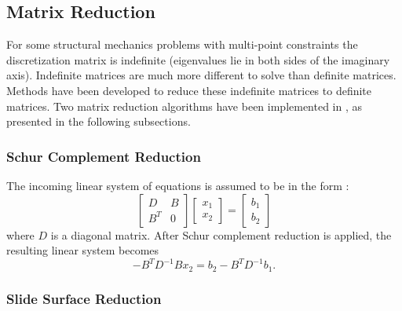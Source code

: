 \subsection{Matrix Reduction}
                                                                                
For some structural mechanics problems with multi-point constraints the
discretization matrix is indefinite (eigenvalues lie in both sides of
the imaginary axis). Indefinite matrices are much more different to solve
than definite matrices. Methods have been developed to reduce these
indefinite matrices to definite matrices.  Two matrix reduction algorithms
have been implemented in \hypre{}, as presented in the following subsections.
                                                                                
\subsubsection{Schur Complement Reduction}
                                                                                
The incoming linear system of equations is assumed to be in the form :
\[ \left[
\begin{array}{cc}
   D   & B \\
   B^T & 0
\end{array}
  \right]
  \left[
\begin{array}{c}
   x_1 \\
   x_2
\end{array}
  \right]
  =
  \left[
\begin{array}{c}
   b_1 \\
   b_2
\end{array}
  \right]
\]
where $D$ is a diagonal matrix.  After Schur complement reduction is applied,
the resulting linear system becomes
$$
- B^T D^{-1} B x_2 = b_2 - B^T D^{-1} b_1.
$$
                                                                                
\subsubsection{Slide Surface Reduction}
                                                                                
